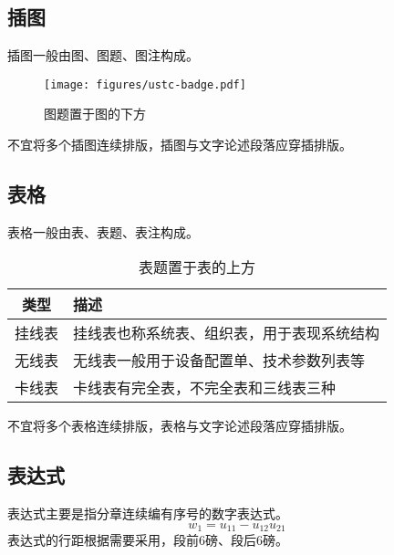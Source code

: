 \subsection{插图}

插图一般由图、图题、图注构成。

\begin{figure}[h]
  \centering
  \texttt{[image: figures/ustc-badge.pdf]}
  \caption{图题置于图的下方}
  \label{fig:example}
\end{figure}

不宜将多个插图连续排版，插图与文字论述段落应穿插排版。

\subsection{表格}

表格一般由表、表题、表注构成。

\begin{table}[h]
  \centering
  \caption{表题置于表的上方}
  \label{tab:example}
  \begin{tabular}{cl}
    \toprule
    类型   & 描述                                       \\
    \midrule
    挂线表 & 挂线表也称系统表、组织表，用于表现系统结构 \\
    无线表 & 无线表一般用于设备配置单、技术参数列表等   \\
    卡线表 & 卡线表有完全表，不完全表和三线表三种       \\
    \bottomrule
  \end{tabular}
\end{table}

不宜将多个表格连续排版，表格与文字论述段落应穿插排版。

\clearpage

\subsection{表达式}

表达式主要是指分章连续编有序号的数字表达式。
\begin{equation}
  w_1 = u_{11} - u_{12} u_{21}
  \label{eq:example}
\end{equation}
表达式的行距根据需要采用，段前6磅、段后6磅。


